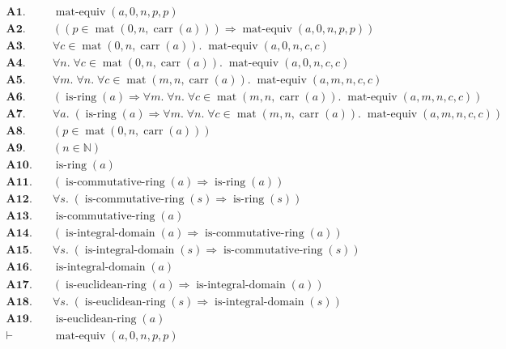 \documentclass[11pt]{article}
\theoremstyle{plain}
\begin{document}
\begin{align*}
  \mathbf{A1.}\quad & \operatorname{mat\text{-}equiv}(a, 0, n, p, p) \\
  \mathbf{A2.}\quad & ((p \in \operatorname{mat}(0, n, \operatorname{carr}(a))) \Rightarrow \operatorname{mat\text{-}equiv}(a, 0, n, p, p)) \\
  \mathbf{A3.}\quad & \forall c \in \operatorname{mat}(0, n, \operatorname{carr}(a)).\; \operatorname{mat\text{-}equiv}(a, 0, n, c, c) \\
  \mathbf{A4.}\quad & \forall n.\; \forall c \in \operatorname{mat}(0, n, \operatorname{carr}(a)).\; \operatorname{mat\text{-}equiv}(a, 0, n, c, c) \\
  \mathbf{A5.}\quad & \forall m.\; \forall n.\; \forall c \in \operatorname{mat}(m, n, \operatorname{carr}(a)).\; \operatorname{mat\text{-}equiv}(a, m, n, c, c) \\
  \mathbf{A6.}\quad & (\operatorname{is\text{-}ring}(a) \Rightarrow \forall m.\; \forall n.\; \forall c \in \operatorname{mat}(m, n, \operatorname{carr}(a)).\; \operatorname{mat\text{-}equiv}(a, m, n, c, c)) \\
  \mathbf{A7.}\quad & \forall a.\; (\operatorname{is\text{-}ring}(a) \Rightarrow \forall m.\; \forall n.\; \forall c \in \operatorname{mat}(m, n, \operatorname{carr}(a)).\; \operatorname{mat\text{-}equiv}(a, m, n, c, c)) \\
  \mathbf{A8.}\quad & (p \in \operatorname{mat}(0, n, \operatorname{carr}(a))) \\
  \mathbf{A9.}\quad & (n \in \mathbb{N}) \\
  \mathbf{A10.}\quad & \operatorname{is\text{-}ring}(a) \\
  \mathbf{A11.}\quad & (\operatorname{is\text{-}commutative\text{-}ring}(a) \Rightarrow \operatorname{is\text{-}ring}(a)) \\
  \mathbf{A12.}\quad & \forall s.\; (\operatorname{is\text{-}commutative\text{-}ring}(s) \Rightarrow \operatorname{is\text{-}ring}(s)) \\
  \mathbf{A13.}\quad & \operatorname{is\text{-}commutative\text{-}ring}(a) \\
  \mathbf{A14.}\quad & (\operatorname{is\text{-}integral\text{-}domain}(a) \Rightarrow \operatorname{is\text{-}commutative\text{-}ring}(a)) \\
  \mathbf{A15.}\quad & \forall s.\; (\operatorname{is\text{-}integral\text{-}domain}(s) \Rightarrow \operatorname{is\text{-}commutative\text{-}ring}(s)) \\
  \mathbf{A16.}\quad & \operatorname{is\text{-}integral\text{-}domain}(a) \\
  \mathbf{A17.}\quad & (\operatorname{is\text{-}euclidean\text{-}ring}(a) \Rightarrow \operatorname{is\text{-}integral\text{-}domain}(a)) \\
  \mathbf{A18.}\quad & \forall s.\; (\operatorname{is\text{-}euclidean\text{-}ring}(s) \Rightarrow \operatorname{is\text{-}integral\text{-}domain}(s)) \\
  \mathbf{A19.}\quad & \operatorname{is\text{-}euclidean\text{-}ring}(a) \\
  \vdash\quad & \operatorname{mat\text{-}equiv}(a, 0, n, p, p)
\end{align*}
\end{document}
